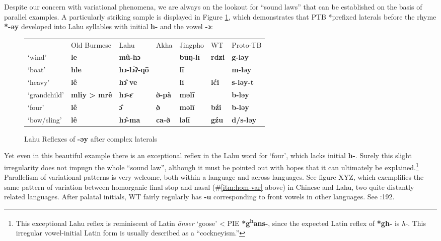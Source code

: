Despite our concern with variational phenomena, we are always on the lookout for “sound laws” that can be established on the basis of parallel examples. A particularly striking sample is displayed in Figure \ref{fig:Lahu_əy}, which demonstrates that PTB *prefixed laterals before the rhyme \textbf{*-əy} developed into Lahu syllables with initial \textbf{h-} and the vowel \textbf{-ɔ}:

\begin{figure}[h!]
\caption{Lahu Reflexes of \textbf{-əy} after complex laterals}
\begin{tabular}{l l l l l l l}
 & Old Burmese & Lahu & Akha & Jingpho & WT & Proto-TB\\
‘wind’ & \textbf{le} & \textbf{mû-hɔ} & \textbf{} & \textbf{būŋ-lī} & \textbf{rdzi} & \textbf{g-ləy}\\
‘boat’ & \textbf{hle} & \textbf{hɔ-lɔ̀ʔ-qō} & \textbf{} & \textbf{lī} & \textbf{} & \textbf{m-ləy}\\
‘heavy’ & \textbf{lê} & \textbf{hɔ̂ ve} & \textbf{} & \textbf{lī} & \textbf{lći} & \textbf{s-ləy-t}\\
‘grandchild’ & \textbf{mliy > mrê} & \textbf{hɔ̄-ɛ̄} & \textbf{ø̀-pà} & \textbf{məlī} & \textbf{} & \textbf{b-ləy}\\
‘four’ & \textbf{lê} & \textbf{ɔ̂} & \textbf{ø̀} & \textbf{məlī} & \textbf{bźi} & \textbf{b-ləy}\\
‘bow/sling’ & \textbf{lê} & \textbf{hɔ̂-ma} & \textbf{ca-ø̀} & \textbf{ləlī} & \textbf{gźu} & \textbf{d/s-ləy}\\
\end{tabular}
\label{fig:Lahu_əy}
\end{figure}

Yet even in this beautiful example there is an exceptional reflex in the Lahu word for ‘four’, which lacks initial \textbf{h-}. Surely this slight irregularity does not impugn the whole “sound law”, although it must be pointed out with hopes that it can ultimately be explained.\footnote{This exceptional Lahu reflex is reminiscent of Latin \textit{\=anser} ‘goose’ < PIE \textbf{*g\textsuperscript{h}ans-}, since the expected Latin reflex of \textbf{*gh-} is \textit{h-}. This irregular vowel-initial Latin form is usually described as a “cockneyism.”} Parallelism of variational patterns is very welcome, both within a language and across languages. See figure XYZ, which exemplifies the same pattern of variation between homorganic final stop and nasal (\#\ref{itm:hom-var} above) in Chinese and Lahu, two quite distantly related languages. After palatal initials, WT fairly regularly has \textbf{-u} corresponding to front vowels in other languages. See \textit{}:192.


